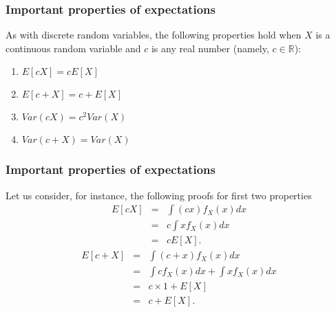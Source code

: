 \documentclass[notes=show,smaller,handout]{beamer}\usepackage[]{graphicx}\usepackage[]{color}
\newenvironment{stepenumerate}{\begin{enumerate}[<+->]}{\end{enumerate}}
\begin{document}
\begin{frame}%

\frametitle{Important properties of expectations}

 As with discrete random variables, the following properties hold when $%
X$ is a continuous random variable and $c$ is any real number (namely, $c \in \mathbb{R}$):
\vspace{0.5cm}

\begin{stepenumerate}
\item $E\left[ cX\right] =cE\left[ X\right] $ \\ \vspace{0.25cm}

\item $E\left[ c+X\right] =c+E\left[ X\right] $ \\ \vspace{0.25cm}

\item $Var\left( cX\right) =c^{2}Var\left( X\right) $ \\ \vspace{0.25cm}

\item $Var\left( c+X\right) =Var\left( X\right) $
\end{stepenumerate}

\end{frame}%

\begin{frame}%

\frametitle{Important properties of expectations}

Let us consider, for instance, the following proofs for first two properties%
\begin{eqnarray*}
E\left[ cX\right] &=&\int \left( cx\right) f_{X}\left( x\right) dx \\
&=&c\int xf_{X}\left( x\right) dx \\
&=&cE\left[ X\right].
\end{eqnarray*}%
\begin{eqnarray*}
E\left[ c+X\right] &=&\int \left( c+x\right) f_{X}\left( x\right) dx \\
&=&\int cf_{X}\left( x\right) dx+\int xf_{X}\left( x\right) dx \\
&=&c\times 1+E\left[ X\right] \\
&=&c+E\left[ X\right].
\end{eqnarray*}

\end{frame}%
\end{document}
